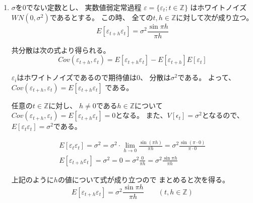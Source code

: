 \documentclass[12pt,b5paper]{ltjsarticle}
\begin{document}
\hrulefill

\begin{enumerate}
 \item
      $\sigma$を$0$でない定数とし、
      実数値弱定常過程
      $\varepsilon = \{ \varepsilon_{t} ; t\in\mathbb{Z}\}$
      はホワイトノイズ$WN(0,\sigma^2)$であるとする。
      この時、
      全ての$t,h \in\mathbb{Z}$に対して次が成り立つ。
      \begin{equation}
       E [ \varepsilon_{t+h}\varepsilon_{t} ]=
        \sigma^2\frac{\sin{\pi h}}{\pi h}
      \end{equation}

      \dotfill

      共分散は次の式より得られる。
      \begin{equation}
       Cov( \varepsilon_{t+h}, \varepsilon_{t} )
        = E[ \varepsilon_{t+h} \varepsilon_{t} ]
        - E[ \varepsilon_{t+h}] E[ \varepsilon_{t} ]
      \end{equation}

      $\varepsilon_{i}$はホワイトノイズであるので期待値は0、
      分散は$\sigma^2$である。
      よって、
      $Cov( \varepsilon_{t+h}, \varepsilon_{t} )
      =E[ \varepsilon_{t+h} \varepsilon_{t} ]$
      である。

      任意の$t\in\mathbb{Z}$に対し、
      $h\ne 0$である$h\in\mathbb{Z}$について
      $Cov( \varepsilon_{t+h}, \varepsilon_{t} ) =E[ \varepsilon_{t+h} \varepsilon_{t} ]=0$となる。
      また、$V[\epsilon_{t}]=\sigma^2$となるので、
      $E[ \varepsilon_{t} \varepsilon_{t} ]=\sigma^2$である。

      \begin{gather}
       E[ \varepsilon_{t} \varepsilon_{t} ]=\sigma^2
        =\sigma^2\cdot \lim_{h\rightarrow 0}\frac{\sin{(\pi h)}}{\pi h}
        =\sigma^2\frac{\sin{(\pi\cdot 0)}}{\pi\cdot 0}\\
       E[ \varepsilon_{t+h} \varepsilon_{t} ]=\sigma^2
        =0
        =\sigma^2\frac{ 0}{\pi h}
        =\sigma^2\frac{ \sin{\pi h}}{\pi h}
      \end{gather}

      上記のように$h$の値について式が成り立つので
      まとめると次を得る。
      \begin{equation}
       E [ \varepsilon_{t+h}\varepsilon_{t} ]=
        \sigma^2\frac{\sin{\pi h}}{\pi h}
        \qquad
        (t,h\in\mathbb{Z})
      \end{equation}


      \hrulefill


\end{enumerate}
\end{document}
